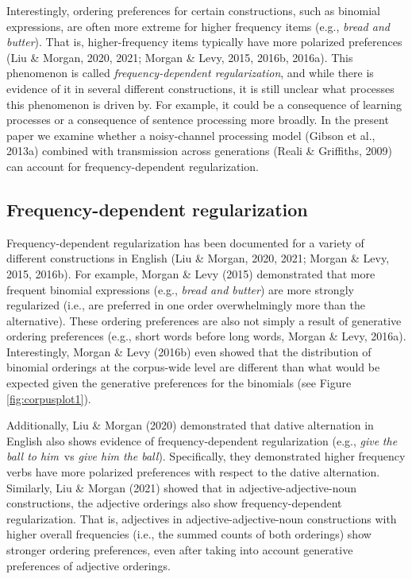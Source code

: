 \documentclass[10pt, letterpaper]{article}
\begin{document}
Interestingly, ordering preferences for certain constructions, such as
binomial expressions, are often more extreme for higher frequency items
(e.g., \emph{bread and butter}). That is, higher-frequency items
typically have more polarized preferences (Liu \& Morgan, 2020, 2021;
Morgan \& Levy, 2015, 2016b, 2016a). This phenomenon is called
\emph{frequency-dependent regularization}, and while there is evidence
of it in several different constructions, it is still unclear what
processes this phenomenon is driven by. For example, it could be a
consequence of learning processes or a consequence of sentence
processing more broadly. In the present paper we examine whether a
noisy-channel processing model (Gibson et al., 2013a) combined with
transmission across generations (Reali \& Griffiths, 2009) can account
for frequency-dependent regularization.

\hypertarget{frequency-dependent-regularization}{%
\subsection{Frequency-dependent
regularization}\label{frequency-dependent-regularization}}

Frequency-dependent regularization has been documented for a variety of
different constructions in English (Liu \& Morgan, 2020, 2021; Morgan \&
Levy, 2015, 2016b). For example, Morgan \& Levy (2015) demonstrated that
more frequent binomial expressions (e.g., \emph{bread and butter}) are
more strongly regularized (i.e., are preferred in one order
overwhelmingly more than the alternative). These ordering preferences
are also not simply a result of generative ordering preferences (e.g.,
short words before long words, Morgan \& Levy, 2016a). Interestingly,
Morgan \& Levy (2016b) even showed that the distribution of binomial
orderings at the corpus-wide level are different than what would be
expected given the generative preferences for the binomials (see Figure
\ref{fig:corpusplot1}).

Additionally, Liu \& Morgan (2020) demonstrated that dative alternation
in English also shows evidence of frequency-dependent regularization
(e.g., \emph{give} \emph{the ball to him}~vs \emph{give him the ball}).
Specifically, they demonstrated higher frequency verbs have more
polarized preferences with respect to the dative alternation. Similarly,
Liu \& Morgan (2021) showed that in adjective-adjective-noun
constructions, the adjective orderings also show frequency-dependent
regularization. That is, adjectives in adjective-adjective-noun
constructions with higher overall frequencies (i.e., the summed counts
of both orderings) show stronger ordering preferences, even after taking
into account generative preferences of adjective orderings.
\end{document}
